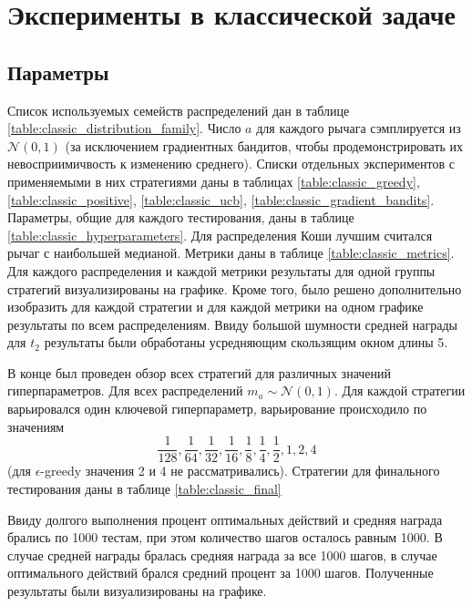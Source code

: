 
\chapter{Эксперименты в классической задаче} %

\label{ExperimentsClassic} %

\section{Параметры}

Список используемых семейств распределений дан в таблице \ref{table:classic_distribution_family}. Число $a$ для каждого рычага сэмплируется из $\mathcal{N}(0,1)$ (за исключением градиентных бандитов, чтобы продемонстрировать их невосприимичвость к изменению среднего). Списки отдельных экспериментов с применяемыми в них стратегиями даны в таблицах \ref{table:classic_greedy}, \ref{table:classic_positive}, \ref{table:classic_ucb}, \ref{table:classic_gradient_bandits}. Параметры, общие для каждого тестирования, даны в таблице \ref{table:classic_hyperparameters}. Для распределения Коши лучшим считался рычаг с наибольшей медианой. Метрики даны в таблице \ref{table:classic_metrics}. Для каждого распределения и каждой метрики результаты для одной группы стратегий визуализированы на графике. Кроме того, было решено дополнительно изобразить для каждой стратегии и для каждой метрики на одном графике результаты по всем распределениям. Ввиду большой шумности средней награды для $t_2$ результаты были обработаны усредняющим скользящим окном длины 5.

В конце был проведен обзор всех стратегий для различных значений гиперпараметров. Для всех распределений $m_a \sim \mathcal{N}(0,1)$. Для каждой стратегии варьировался один ключевой гиперпараметр, варьирование происходило по значениям
\[
\frac{1}{128}, \frac{1}{64}, \frac{1}{32}, \frac{1}{16}, \frac{1}{8}, \frac{1}{4}, \frac{1}{2}, 1, 2, 4
\]
(для $\epsilon$-greedy значения 2 и 4 не рассматривались). Стратегии для финального тестирования даны в таблице \ref{table:classic_final} 
 
Ввиду долгого выполнения процент оптимальных действий и средняя награда брались по 1000 тестам, при этом количество шагов осталось равным 1000. В случае средней награды бралась средняя награда за все 1000 шагов, в случае оптимального действий брался средний процент за 1000 шагов. Полученные результаты были визуализированы на графике.

